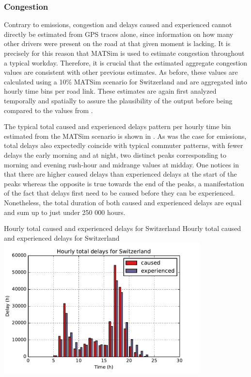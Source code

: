 \subsubsection{Congestion}

Contrary to emissions, congestion and delays caused and experienced cannot directly be estimated from GPS traces alone, since information on how many other drivers were present on the road at that given moment is lacking.
It is precisely for this reason that MATSim is used to estimate congestion throughout a typical workday.
Therefore, it is crucial that the estimated aggregate congestion values are consistent with other previous estimates.
As before, these values are calculated using a 10\% MATSim scenario for Switzerland and are aggregated into hourly time bins per road link.
These estimates are again first analyzed temporally and spatially to assure the plausibility of the output before being compared to the values from \citet{mkinfras2016staukosten}.

The typical total caused and experienced delays pattern per hourly time bin estimated from the MATSim scenario is shown in .
As was the case for emissions, total delays also expectedly coincide with typical commuter patterns, with fewer delays the early morning and at night, two distinct peaks corresponding to morning and evening rush-hour and midrange values at midday.
One notices in  that there are higher caused delays than experienced delays at the start of the peaks whereas the opposite is true towards the end of the peaks, a manifestation of the fact that delays first need to be caused before they can be experienced.
Nonetheless, the total duration of both caused and experienced delays are equal and sum up to just under 250 000 hours.


\createfigure%
{Hourly total caused and experienced delays for Switzerland}%
{Hourly total caused and experienced delays for Switzerland}%
{\label{fig:hourlyDelays}}%
{\includegraphics[width=0.8\textwidth,
angle=0]{figures/hourly_delays.pdf}}%
{}

